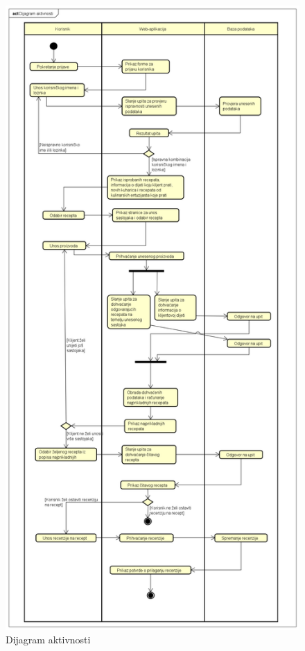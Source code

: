 			\begin{figure}[H]
			\includegraphics[scale=0.2]{dijagrami/UML_dijagram_aktivnosti.png} %
			\centering
			\caption{Dijagram aktivnosti}
			\label{Dijagram aktivnosti}
		\end{figure}
		
